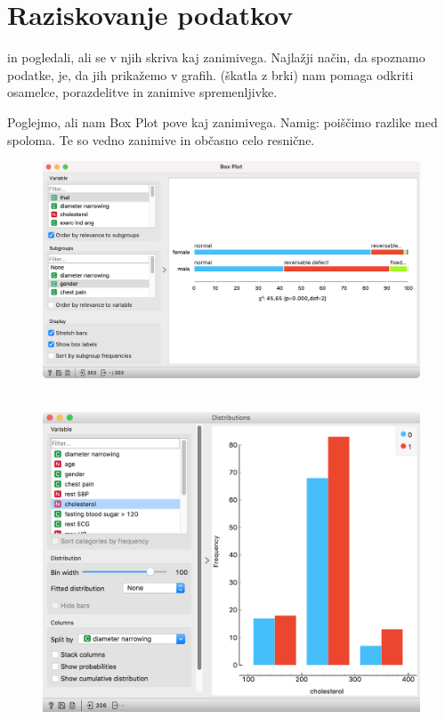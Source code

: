 \chapter{Raziskovanje podatkov}
\label{ch:raziskovanje-podatkov}

 in pogledali, ali se v njih skriva kaj zanimivega. Najlažji način, da spoznamo podatke, je, da jih prikažemo v grafih.  (škatla z brki) nam pomaga odkriti osamelce, porazdelitve in zanimive spremenljivke.

Poglejmo, ali nam Box Plot pove kaj zanimivega. Namig: poiščimo razlike med spoloma. Te so vedno zanimive in občasno celo resnične.

\begin{figure}[h]
    \centering
    \includegraphics[width=\textwidth]{box-plot.png}
    \caption{$\;$}  %
\end{figure}

\begin{figure}
    \includegraphics[scale=0.35]{distributions.png}
    \caption{$\;$}
\end{figure}

